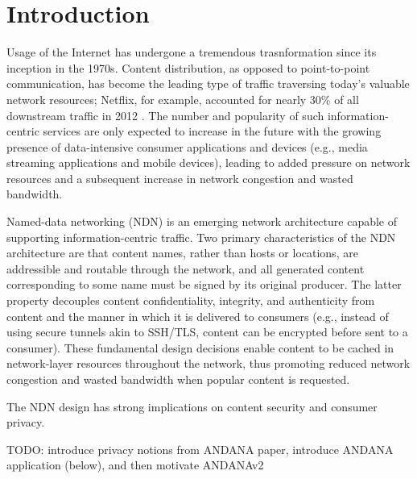 \section{Introduction} \label{sec:introduction}
Usage of the Internet has undergone a tremendous trasnformation since its inception in the 1970s. Content distribution, as opposed to point-to-point communication, has become the leading type of traffic traversing today's valuable network resources; Netflix, for example, accounted for nearly 30\% of all downstream traffic in 2012 \cite{Netflix}. The number and popularity of such information-centric services are only expected to increase in the future with the growing presence of data-intensive consumer applications and devices (e.g., media streaming applications and mobile devices), leading to added pressure on network resources and a subsequent increase in network congestion and wasted bandwidth. 

Named-data networking (NDN) \cite{ndn-techreport} is an emerging network architecture capable of supporting information-centric traffic. Two primary characteristics of the NDN architecture are that content names, rather than hosts or locations, are addressible and routable through the network, and all generated content corresponding to some name must be signed by its original producer. The latter property decouples content confidentiality, integrity, and authenticity from content and the manner in which it is delivered to consumers (e.g., instead of using secure tunnels akin to SSH/TLS, content can be encrypted before sent to a consumer). These fundamental design decisions enable content to be cached in network-layer resources throughout the network, thus promoting reduced network congestion and wasted bandwidth when popular content is requested. 

The NDN design has strong implications on content security and consumer privacy. 

TODO: introduce privacy notions from ANDANA paper, introduce ANDANA application (below), and then motivate ANDANAv2

